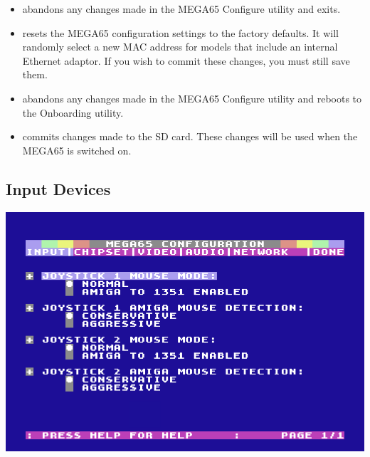 \begin{itemize}
  \item {} abandons any changes made in the MEGA65 Configure utility and exits.
  \item {} resets the MEGA65 configuration settings to the factory defaults. It will randomly select a new MAC address for models that include an internal Ethernet adaptor. If you wish to commit these changes, you must still save them.
  \item {} abandons any changes made in the MEGA65 Configure utility and reboots to the Onboarding utility.
  \item {} commits changes made to the SD card. These changes will be used when the MEGA65 is switched on.
\end{itemize}

\subsection{Input Devices}

\begin{center}
\includegraphics[width=0.7\linewidth]{images/ss-m65config-1.png}
\end{center}

